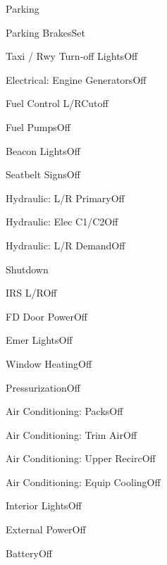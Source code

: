 \documentclass[sim-use]{checklist}
\begin{document}
\begin{checklist}{Parking}
  \item{Parking Brakes}{Set}
  \item{Taxi / Rwy Turn-off Lights}{Off}
  \item{Electrical: Engine Generators}{Off}
  \item{Fuel Control L/R}{Cutoff}
  \item{Fuel Pumps}{Off}
  \item{Beacon Lights}{Off}
  \item{Seatbelt Signs}{Off}
  \item{Hydraulic: L/R Primary}{Off}
  \item{Hydraulic: Elec C1/C2}{Off}
  \item{Hydraulic: L/R Demand}{Off}
\end{checklist}

\begin{checklist}{Shutdown}
  \item{IRS L/R}{Off}
  \item{FD Door Power}{Off}
  \item{Emer Lights}{Off}
  \item{Window Heating}{Off}
  \item{Pressurization}{Off}
  \item{Air Conditioning: Packs}{Off}
  \item{Air Conditioning: Trim Air}{Off}
  \item{Air Conditioning: Upper Recirc}{Off}
  \item{Air Conditioning: Equip Cooling}{Off}
  \item{Interior Lights}{Off}
  \item{External Power}{Off}
  \item{Battery}{Off}
\end{checklist}
\end{document}
